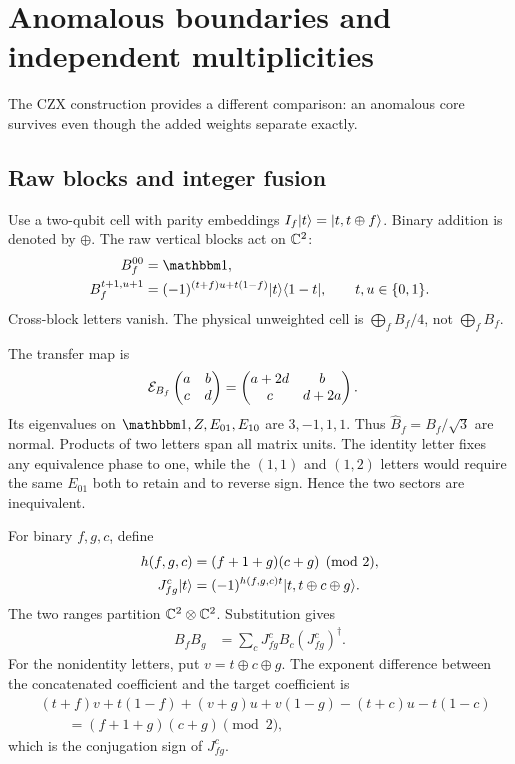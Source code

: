 \section{Anomalous boundaries and independent multiplicities}
\label{sec:intrinsic-anomaly}

The CZX construction provides a different comparison: an anomalous
core survives even though the added weights separate exactly.

\subsection{Raw blocks and integer fusion}

Use a two-qubit cell with parity embeddings
$I_f\lvert t\rangle=\lvert t,t\oplus f\rangle$. Binary addition is denoted by
$\oplus$. The raw vertical blocks act on $\mathbb{C}^2$:
\begin{align}
	B_f^{00} & =\Id,                                 \\
	B_f^{t+1,u+1}
	         & =(-1)^{(t+f)u+t(1-f)}\ket t\bra{1-t},
	\qquad t,u\in\{0,1\}.
	\label{eq:CZX-B}
\end{align}
Cross-block letters vanish. The physical unweighted cell is
$\bigoplus_fB_f/4$, not $\bigoplus_fB_f$.

The transfer map is
\begin{align}
	\mathcal{E}_{B_f}
	\begin{pmatrix}a&b\\c&d\end{pmatrix}
	 & =\begin{pmatrix}a+2d&b\\c&d+2a\end{pmatrix}.
\end{align}
Its eigenvalues on $\Id,Z,E_{01},E_{10}$ are $3,-1,1,1$.
Thus $\widehat B_f=B_f/\sqrt3$ are normal. Products of two
letters span all matrix units. The identity letter fixes any
equivalence phase to one, while the $(1,1)$ and $(1,2)$ letters
would require the same $E_{01}$ both to retain and to reverse
sign. Hence the two sectors are inequivalent.

For binary $f,g,c$, define
\begin{align}
	h(f,g,c) & =(f+1+g)(c+g)\pmod2,                        \\
	J_{fg}^c\lvert t\rangle
	         & =(-1)^{h(f,g,c)t}\lvert t,t\oplus c\oplus g\rangle.
\end{align}
The two ranges partition $\mathbb{C}^2\otimes\mathbb{C}^2$. Substitution gives
\begin{align}
	B_fB_g & =\sum_cJ_{fg}^cB_c(J_{fg}^c)^\dagger.
	\label{eq:CZX-fusion}
\end{align}
For the nonidentity letters, put $v=t\oplus c\oplus g$.
The exponent difference between the concatenated coefficient and
the target coefficient is
\begin{align}
	 & (t+f)v+t(1-f)+(v+g)u+v(1-g)
	-(t+c)u-t(1-c)\nonumber        \\
	 & \qquad=(f+1+g)(c+g)\pmod2,
\end{align}
which is the conjugation sign of $J_{fg}^c$.

